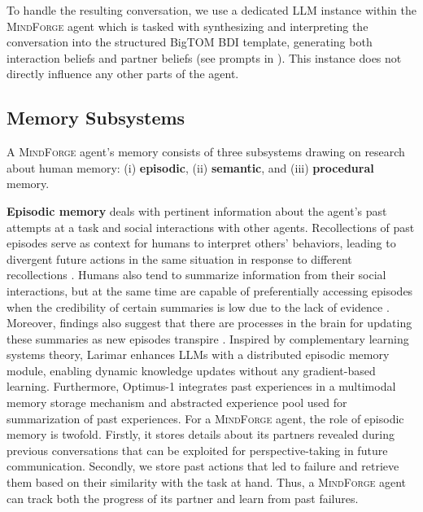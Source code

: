 \documentclass{article}
\newcommand{\collabvoyager}[0]{\mbox{\textsc{MindForge}}\xspace}
\begin{document}
To handle the resulting conversation, we use a dedicated LLM instance within the \collabvoyager agent which is tasked with synthesizing and interpreting the conversation into the structured BigTOM BDI template, generating both interaction beliefs and partner beliefs (see prompts in ). This instance does not directly influence any other parts of the agent.

\subsection{Memory Subsystems}\label{ssec:memory-subsys}

A \collabvoyager agent's memory consists of three subsystems drawing on research about human memory: (i) \textbf{episodic}, (ii) \textbf{semantic}, and (iii) \textbf{procedural} memory.

\textbf{Episodic memory} deals with pertinent information about the agent's past attempts at a task and social interactions with other agents. 
Recollections of past episodes serve as context for humans to interpret others' behaviors, leading to divergent future actions in the same situation in response to different recollections \citep{bornstein2017reminders}. 
Humans also tend to summarize information from their social interactions, but at the same time are capable of preferentially accessing episodes when the credibility of certain summaries is low due to the lack of evidence \citep{Klein2009-vz}. Moreover, findings also suggest that there are processes in the brain for updating these summaries as new episodes transpire \cite{Klein1993-vu,Klein2009-vz}. Inspired by complementary learning systems theory, Larimar \citep{das2024larimar} enhances LLMs with a distributed episodic memory module, enabling dynamic knowledge updates without any gradient-based learning. Furthermore, Optimus-1 integrates past experiences in a multimodal memory storage mechanism and abstracted experience pool used for summarization of past experiences. For a \collabvoyager agent, the role of episodic memory is twofold. Firstly, it stores details about its partners revealed during previous conversations that can be exploited for perspective-taking in future communication. Secondly, we store past actions that led to failure and retrieve them based on their similarity with the task at hand. Thus, a \collabvoyager agent can track both the progress of its partner and learn from past failures.
\end{document}
